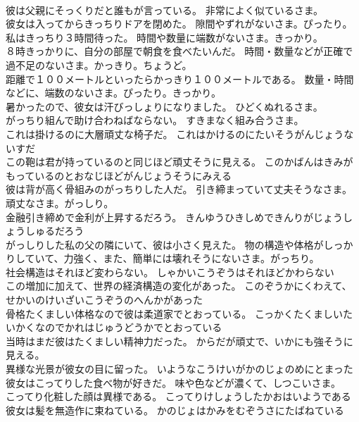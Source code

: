 \documentclass[8pt]{extreport}
\begin{document}
\begin{CJK}{UTF8}{min}
\\	彼は父親にそっくりだと誰もが言っている。	非常によく似ているさま。
\\	彼女は入ってからきっちりドアを閉めた。	隙間やずれがないさま。ぴったり。
\\	私はきっちり３時間待った。	時間や数量に端数がないさま。きっかり。
\\	８時きっかりに、自分の部屋で朝食を食べたいんだ。	時間・数量などが正確で過不足のないさま。かっきり。ちょうど。
\\	距離で１００メートルといったらかっきり１００メートルである。	数量・時間などに、端数のないさま。ぴったり。きっかり。
\\	暑かったので、彼女は汗びっしょりになりました。	ひどくぬれるさま。
\\	がっちり組んで助け合わねばならない。	すきまなく組み合うさま。
\\	これは掛けるのに大層頑丈な椅子だ。	これはかけるのにたいそうがんじょうないすだ 
\\	この鞄は君が持っているのと同じほど頑丈そうに見える。	このかばんはきみがもっているのとおなじほどがんじょうそうにみえる 
\\	彼は背が高く骨組みのがっちりした人だ。	引き締まっていて丈夫そうなさま。頑丈なさま。がっしり。
\\	金融引き締めで金利が上昇するだろう。	きんゆうひきしめできんりがじょうしょうしゅるだろう 
\\	がっしりした私の父の隣にいて、彼は小さく見えた。	物の構造や体格がしっかりしていて、力強く、また、簡単には壊れそうにないさま。がっちり。
\\	社会構造はそれほど変わらない。	しゃかいこうぞうはそれほどかわらない 
\\	この増加に加えて、世界の経済構造の変化があった。	このぞうかにくわえて、せかいのけいざいこうぞうのへんかがあった 
\\	骨格たくましい体格なので彼は柔道家でとおっている。	こっかくたくましいたいかくなのでかれはじゅうどうかでとおっている 
\\	当時はまだ彼はたくましい精神力だった。	からだが頑丈で、いかにも強そうに見える。
\\	異様な光景が彼女の目に留った。	いようなこうけいがかのじょのめにとまった 
\\	彼女はこってりした食べ物が好きだ。	味や色などが濃くて、しつこいさま。
\\	こってり化粧した顔は異様である。	こってりけしょうしたかおはいようである 
\\	彼女は髪を無造作に束ねている。	かのじょはかみをむぞうさにたばねている 

\end{CJK}
\end{document}
